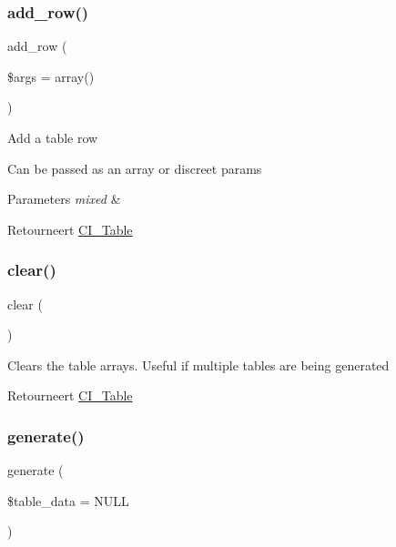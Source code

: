 \subsubsection{\texorpdfstring{add\_row()}{add\_row()}}
{\footnotesize\ttfamily add\+\_\+row (\begin{DoxyParamCaption}\item[{}]{\$args = {\ttfamily array()} }\end{DoxyParamCaption})}

Add a table row

Can be passed as an array or discreet params


\begin{DoxyParams}{Parameters}
{\em mixed} & \\
\hline
\end{DoxyParams}
\begin{DoxyReturn}{Retourneert}
\mbox{\hyperlink{class_c_i___table}{C\+I\+\_\+\+Table}} 
\end{DoxyReturn}
\mbox{\label{class_c_i___table_aa821bec12eaa7e0f649397c9675ff505}} 
\subsubsection{\texorpdfstring{clear()}{clear()}}
{\footnotesize\ttfamily clear (\begin{DoxyParamCaption}{ }\end{DoxyParamCaption})}

Clears the table arrays. Useful if multiple tables are being generated

\begin{DoxyReturn}{Retourneert}
\mbox{\hyperlink{class_c_i___table}{C\+I\+\_\+\+Table}} 
\end{DoxyReturn}
\mbox{\label{class_c_i___table_ad46f79939e16f261c19157809d56aab8}} 
\subsubsection{\texorpdfstring{generate()}{generate()}}
{\footnotesize\ttfamily generate (\begin{DoxyParamCaption}\item[{}]{\$table\+\_\+data = {\ttfamily NULL} }\end{DoxyParamCaption})}

